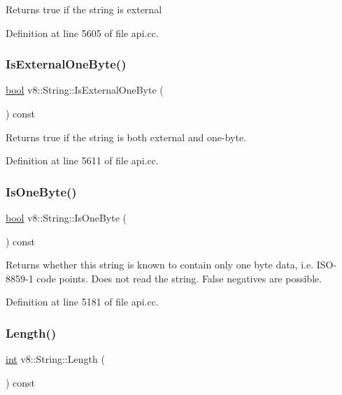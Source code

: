 Returns true if the string is external 

Definition at line 5605 of file api.\+cc.

\mbox{\label{classv8_1_1String_a29b5d1786d906b84e10a5cab9451f976}} 
\subsubsection{\texorpdfstring{Is\+External\+One\+Byte()}{IsExternalOneByte()}}
{\footnotesize\ttfamily \mbox{\hyperlink{classbool}{bool}} v8\+::\+String\+::\+Is\+External\+One\+Byte (\begin{DoxyParamCaption}{ }\end{DoxyParamCaption}) const}

Returns true if the string is both external and one-\/byte. 

Definition at line 5611 of file api.\+cc.

\mbox{\label{classv8_1_1String_a8f14ab3aff52295d2d3245081a1b29eb}} 
\subsubsection{\texorpdfstring{Is\+One\+Byte()}{IsOneByte()}}
{\footnotesize\ttfamily \mbox{\hyperlink{classbool}{bool}} v8\+::\+String\+::\+Is\+One\+Byte (\begin{DoxyParamCaption}{ }\end{DoxyParamCaption}) const}

Returns whether this string is known to contain only one byte data, i.\+e. I\+S\+O-\/8859-\/1 code points. Does not read the string. False negatives are possible. 

Definition at line 5181 of file api.\+cc.

\mbox{\label{classv8_1_1String_afaa18eae27056bb7058f09920a238f53}} 
\subsubsection{\texorpdfstring{Length()}{Length()}}
{\footnotesize\ttfamily \mbox{\hyperlink{classint}{int}} v8\+::\+String\+::\+Length (\begin{DoxyParamCaption}{ }\end{DoxyParamCaption}) const}

